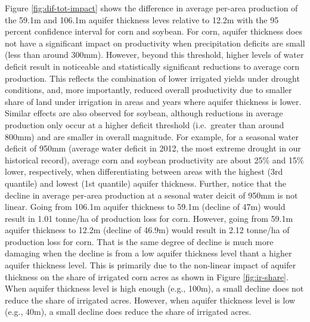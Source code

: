 \documentclass[
]{article}
\begin{document}
Figure \ref{fig:dif-tot-impact} shows the difference in average per-area production of the 59.1m and 106.1m aquifer thickness leves relative to 12.2m with the 95 percent confidence interval for corn and soybean. For corn, aquifer thickness does not have a significant impact on productivity when precipitation deficits are small (less than around 300mm). However, beyond this threshold, higher levels of water deficit result in noticeable and statistically significant reductions to average corn production. This reflects the combination of lower irrigated yields under drought conditions, and, more importantly, reduced overall productivity due to smaller share of land under irrigation in areas and years where aquifer thickness is lower. Similar effects are also observed for soybean, although reductions in average production only occur at a higher deficit threshold (i.e.~greater than around 800mm) and are smaller in overall magnitude. For example, for a seasonal water deficit of 950mm (average water deficit in 2012, the most extreme drought in our historical record), average corn and soybean productivity are about 25\% and 15\% lower, respectively, when differentiating between areas with the highest (3rd quantile) and lowest (1st quantile) aquifer thickness. Further, notice that the decline in average per-area production at a sesonal water deicit of 950mm is not linear. Going from 106.1m aquifer thickness to 59.1m (decline of 47m) would result in 1.01 tonne/ha of production loss for corn. However, going from 59.1m aquifer thickness to 12.2m (decline of 46.9m) would result in 2.12 tonne/ha of production loss for corn. That is the same degree of decline is much more damaging when the decline is from a low aquifer thickness level thant a higher aquifer thickness level. This is primarily due to the non-linear impact of aquifer thickness on the share of irrigated corn acres as shown in Figure \ref{fig:ir-share}. When aquifer thickness level is high enough (e.g., 100m), a small decline does not reduce the share of irrigated acres. However, when aquifer thickness level is low (e.g., 40m), a small decline does reduce the share of irrigated acres.
\end{document}
